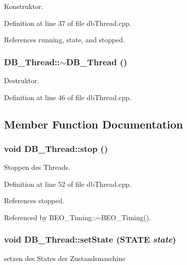 Konstruktor. 



Definition at line 37 of file dbThread.cpp.

References running, state, and stopped.\hypertarget{class_d_b___thread_3c4f9d073814887a717de180b2e8e6b9}{
\subsubsection[$\sim$DB\_\-Thread]{\setlength{\rightskip}{0pt plus 5cm}DB\_\-Thread::$\sim$DB\_\-Thread ()}}
\label{class_d_b___thread_3c4f9d073814887a717de180b2e8e6b9}


Destruktor. 



Definition at line 46 of file dbThread.cpp.

\subsection{Member Function Documentation}
\hypertarget{class_d_b___thread_e468157edacaa0760e833bf643371e62}{
\subsubsection[stop]{\setlength{\rightskip}{0pt plus 5cm}void DB\_\-Thread::stop ()}}
\label{class_d_b___thread_e468157edacaa0760e833bf643371e62}


Stoppen des Threads. 



Definition at line 52 of file dbThread.cpp.

References stopped.

Referenced by BEO\_\-Timing::$\sim$BEO\_\-Timing().\hypertarget{class_d_b___thread_5ca406169a78d0e196a7cb57aae01a30}{
\subsubsection[setState]{\setlength{\rightskip}{0pt plus 5cm}void DB\_\-Thread::setState ({\bf STATE} {\em state})}}
\label{class_d_b___thread_5ca406169a78d0e196a7cb57aae01a30}


setzen des States der Zustandsmaschine 



